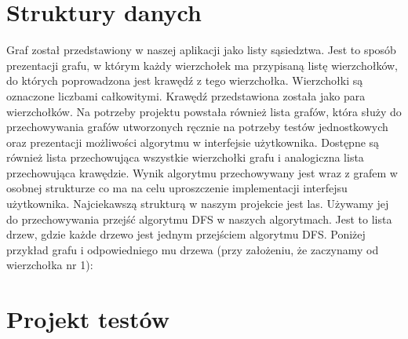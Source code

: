 \documentclass[a4paper,12pt]{mwart}
\begin{document}
\section{Struktury danych}

Graf został przedstawiony w naszej aplikacji jako listy sąsiedztwa. Jest to sposób
prezentacji grafu, w którym każdy wierzchołek ma przypisaną listę wierzchołków, do
których poprowadzona jest krawędź z tego wierzchołka. Wierzchołki
są oznaczone liczbami całkowitymi. Krawędź przedstawiona została jako para
wierzchołków. Na potrzeby projektu powstała również lista grafów, która służy do
przechowywania grafów utworzonych ręcznie na potrzeby testów jednostkowych oraz
prezentacji możliwości algorytmu w interfejsie użytkownika. Dostępne są również
lista przechowująca wszystkie wierzchołki grafu i analogiczna lista
przechowująca krawędzie. Wynik algorytmu przechowywany jest wraz z grafem w
osobnej strukturze co ma na celu uproszczenie implementacji interfejsu
użytkownika. Najciekawszą strukturą w naszym projekcie jest las. Używamy jej do
przechowywania przejść algorytmu DFS w naszych algorytmach. Jest to lista drzew,
gdzie każde drzewo jest jednym przejściem algorytmu DFS. Poniżej przykład
grafu i odpowiedniego mu drzewa (przy założeniu, że zaczynamy od wierzchołka nr
1):

\begin{figure}[H]
  \centering
\end{figure}

\section{Projekt testów}
\end{document}
